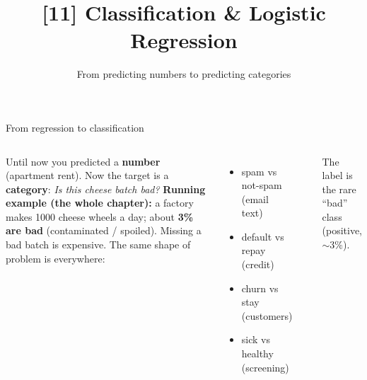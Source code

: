 \documentclass[aspectratio=169]{beamer}
\title{[11] Classification \& Logistic Regression}
\subtitle{From predicting numbers to predicting categories}
\date{}
\begin{document}
\begin{frame}{From regression to classification}
  \begin{columns}[T]
    Until now you predicted a \textbf{number} (apartment rent). Now the target is a
    \textbf{category}:
    \vskip 4pt
    \emph{Is this cheese batch bad?}
    \vskip 6pt
    \textbf{Running example (the whole chapter):} a factory makes 1000 cheese wheels a
    day; about \textbf{3\% are bad} (contaminated / spoiled). Missing a bad batch is
    expensive.
    \vskip 6pt
    The same shape of problem is everywhere:
    \begin{itemize}\small
      \item spam vs not-spam (email text)
      \item default vs repay (credit)
      \item churn vs stay (customers)
      \item sick vs healthy (screening)
    \end{itemize}
    \begin{center}
    \end{center}
    \vskip 6pt
    \footnotesize The label is the rare ``bad'' class (positive, $\sim 3\%$).
  \end{columns}
\end{frame}
\end{document}
